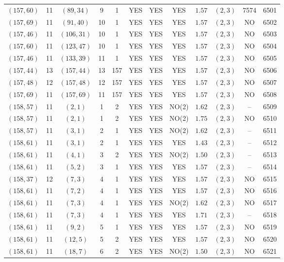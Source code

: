 \begin{longtable}{|c|c|c|c|c|c|c|c|c|c|c|c|}
$(157,60)$ & 11 & $(89,34)$ & 9 & 1 & YES & YES & YES & $1.57$ & $(2,3)$ & 7574 & 6501\\
$(157,69)$ & 11 & $(91,40)$ & 10 & 1 & YES & YES & YES & $1.57$ & $(2,3)$ & NO & 6502\\
$(157,46)$ & 11 & $(106,31)$ & 10 & 1 & YES & YES & YES & $1.57$ & $(2,3)$ & NO & 6503\\
$(157,60)$ & 11 & $(123,47)$ & 10 & 1 & YES & YES & YES & $1.57$ & $(2,3)$ & NO & 6504\\
$(157,46)$ & 11 & $(133,39)$ & 11 & 1 & YES & YES & YES & $1.57$ & $(2,3)$ & NO & 6505\\
$(157,44)$ & 13 & $(157,44)$ & 13 & 157 & YES & YES & YES & $1.57$ & $(2,3)$ & NO & 6506\\
$(157,48)$ & 12 & $(157,48)$ & 12 & 157 & YES & YES & YES & $1.57$ & $(2,3)$ & NO & 6507\\
$(157,69)$ & 11 & $(157,69)$ & 11 & 157 & YES & YES & YES & $1.57$ & $(2,3)$ & NO & 6508\\
$(158,57)$ & 11 & $(2,1)$ & 1 & 2 & YES & YES & NO(2) & $1.62$ & $(2,3)$ & -- & 6509\\
$(158,57)$ & 11 & $(2,1)$ & 1 & 2 & YES & YES & NO(2) & $1.75$ & $(2,3)$ & NO & 6510\\
$(158,57)$ & 11 & $(3,1)$ & 2 & 1 & YES & YES & NO(2) & $1.62$ & $(2,3)$ & -- & 6511\\
$(158,61)$ & 11 & $(3,1)$ & 2 & 1 & YES & YES & YES & $1.43$ & $(2,3)$ & -- & 6512\\
$(158,61)$ & 11 & $(4,1)$ & 3 & 2 & YES & YES & NO(2) & $1.50$ & $(2,3)$ & -- & 6513\\
$(158,61)$ & 11 & $(5,2)$ & 3 & 1 & YES & YES & YES & $1.57$ & $(2,3)$ & -- & 6514\\
$(158,37)$ & 12 & $(7,3)$ & 4 & 1 & YES & YES & YES & $1.57$ & $(2,3)$ & NO & 6515\\
$(158,61)$ & 11 & $(7,2)$ & 4 & 1 & YES & YES & YES & $1.57$ & $(2,3)$ & NO & 6516\\
$(158,61)$ & 11 & $(7,3)$ & 4 & 1 & YES & YES & NO(2) & $1.62$ & $(2,3)$ & NO & 6517\\
$(158,61)$ & 11 & $(7,3)$ & 4 & 1 & YES & YES & YES & $1.71$ & $(2,3)$ & -- & 6518\\
$(158,61)$ & 11 & $(9,2)$ & 5 & 1 & YES & YES & YES & $1.57$ & $(2,3)$ & NO & 6519\\
$(158,61)$ & 11 & $(12,5)$ & 5 & 2 & YES & YES & YES & $1.57$ & $(2,3)$ & NO & 6520\\
$(158,61)$ & 11 & $(18,7)$ & 6 & 2 & YES & YES & NO(2) & $1.50$ & $(2,3)$ & NO & 6521\\

\end{longtable}
